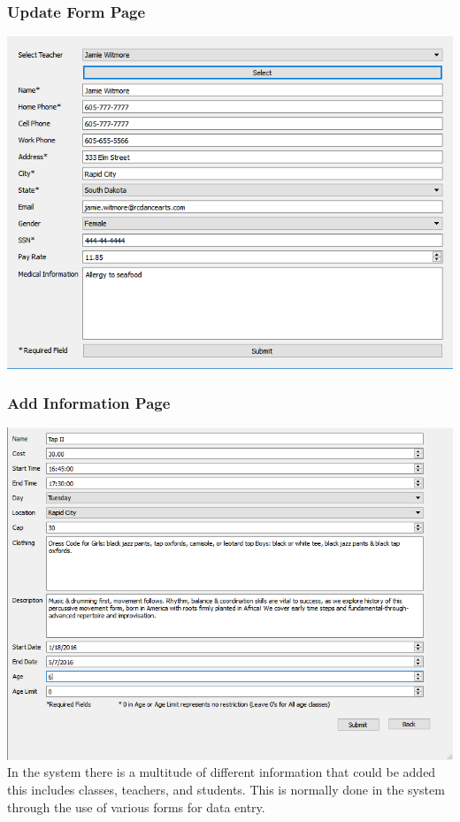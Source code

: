\subsubsection{Update Form Page}
\includegraphics[scale=0.5]{pics/Update Teacher.png}\\

\subsubsection{Add Information Page}
\includegraphics[scale=0.5]{pics/Add_class.png}\\
In the system there is a  multitude of different information that could be added this includes classes, teachers, and students. This is normally done in the system through the use of various forms for data entry.

